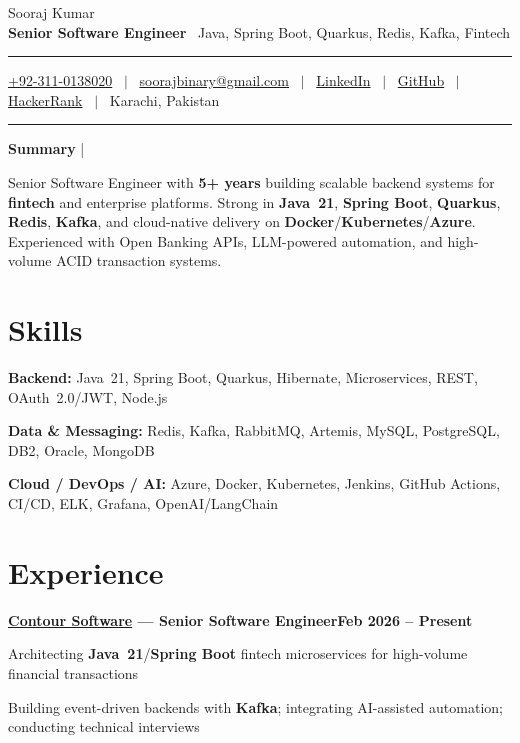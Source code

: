 \documentclass[letterpaper,10pt]{article}
\newcommand{\documentTitle}[2]{
  \begin{center}
    {\LARGE\color{accentTitle} #1}
    \vspace{1pt}\\
    {\small\color{accentText}\textbf{Senior Software Engineer} \textbar\ Java, Spring Boot, Quarkus, Redis, Kafka, Fintech}
    \vspace{3pt}
    {\color{accentLine} \hrule}
    \vspace{2pt}
    \footnotesize{#2}
    \vspace{2pt}
    {\color{accentLine} \hrule}
  \end{center}
}
\newcommand{\tinysection}[1]{
  {\normalsize{\bfseries\color{accentText}#1} {\color{accentLine} |}}
}
\newcommand{\heading}[2]{
  \hspace{6pt}#1\hfill#2\\[-1pt]
}
\newcommand{\headingBf}[2]{
  \heading{\textbf{#1}}{\textbf{#2}}
}
\newenvironment{resume_list}{
  \vspace{-2pt}
  \begin{itemize}[itemsep=0pt, parsep=0pt, topsep=1pt, leftmargin=14pt]
}{
  \end{itemize}
  \vspace{1pt}
}
\begin{document}
\small

\documentTitle{Sooraj Kumar}{
  \href{tel:+923110138020}{+92-311-0138020} ~$|$~
  \href{mailto:soorajbinary@gmail.com}{soorajbinary@gmail.com} ~$|$~
  \href{https://www.linkedin.com/in/soorajb2a/}{LinkedIn} ~$|$~
  \href{https://github.com/sooraj671}{GitHub} ~$|$~
  \href{https://www.hackerrank.com/profile/sooraj_bcss19}{HackerRank} ~$|$~
  Karachi, Pakistan
}

\tinysection{Summary}
\vspace{2pt}
\hspace{6pt}\begin{minipage}{\dimexpr\linewidth-6pt}
Senior Software Engineer with \textbf{5+ years} building scalable backend systems for \textbf{fintech} and enterprise platforms. Strong in \textbf{Java~21}, \textbf{Spring Boot}, \textbf{Quarkus}, \textbf{Redis}, \textbf{Kafka}, and cloud-native delivery on \textbf{Docker}/\textbf{Kubernetes}/\textbf{Azure}. Experienced with Open Banking APIs, LLM-powered automation, and high-volume ACID transaction systems.
\end{minipage}
\vspace{2pt}

\section{Skills}
\begin{resume_list}
  \item \textbf{Backend:} Java~21, Spring Boot, Quarkus, Hibernate, Microservices, REST, OAuth~2.0/JWT, Node.js
  \item \textbf{Data \& Messaging:} Redis, Kafka, RabbitMQ, Artemis, MySQL, PostgreSQL, DB2, Oracle, MongoDB
  \item \textbf{Cloud / DevOps / AI:} Azure, Docker, Kubernetes, Jenkins, GitHub Actions, CI/CD, ELK, Grafana, OpenAI/LangChain
\end{resume_list}

\section{Experience}

\headingBf{\href{https://contour-software.com/}{Contour Software} --- Senior Software Engineer}{Feb 2026 -- Present}
\begin{resume_list}
  \item Architecting \textbf{Java~21}/\textbf{Spring Boot} fintech microservices for high-volume financial transactions
  \item Building event-driven backends with \textbf{Kafka}; integrating AI-assisted automation; conducting technical interviews
\end{resume_list}
\end{document}

